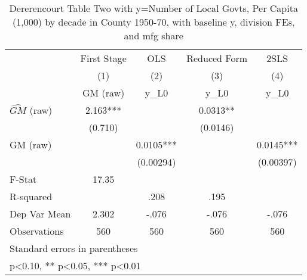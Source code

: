 \begin{table}[htbp]\centering
\def\sym#1{\ifmmode^{#1}\else\(^{#1}\)\fi}
\caption{Dererencourt Table Two with y=Number of Local Govts, Per Capita (1,000) by decade in County 1950-70, with baseline y, division FEs, and mfg share}
\begin{tabular}{l*{4}{c}}
\toprule
                    & First Stage   &         OLS   &Reduced Form   &        2SLS   \\
                    &\multicolumn{1}{c}{(1)}&\multicolumn{1}{c}{(2)}&\multicolumn{1}{c}{(3)}&\multicolumn{1}{c}{(4)}\\
                    &\multicolumn{1}{c}{GM  (raw)}&\multicolumn{1}{c}{y\_L0}&\multicolumn{1}{c}{y\_L0}&\multicolumn{1}{c}{y\_L0}\\
\midrule
$\hat{GM}$ (raw)    &       2.163***&               &      0.0313** &               \\
                    &     (0.710)   &               &    (0.0146)   &               \\
\addlinespace
GM  (raw)           &               &      0.0105***&               &      0.0145***\\
                    &               &   (0.00294)   &               &   (0.00397)   \\
\midrule
F-Stat              &       17.35   &               &               &               \\
R-squared           &               &        .208   &        .195   &               \\
Dep Var Mean        &       2.302   &       -.076   &       -.076   &       -.076   \\
Observations        &         560   &         560   &         560   &         560   \\
\bottomrule
\multicolumn{5}{l}{\footnotesize Standard errors in parentheses}\\
\multicolumn{5}{l}{\footnotesize * p<0.10, ** p<0.05, *** p<0.01}\\
\end{tabular}
\end{table}
